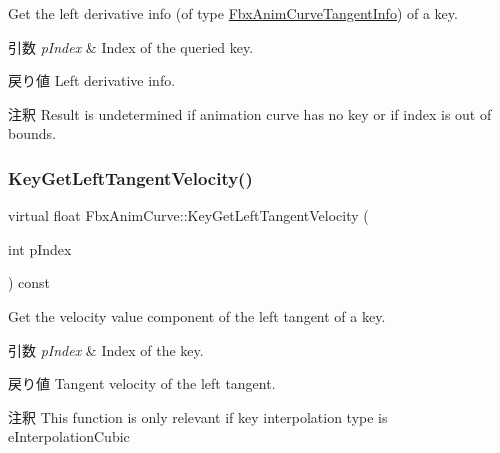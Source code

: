 Get the left derivative info (of type \hyperlink{struct_fbx_anim_curve_tangent_info}{Fbx\+Anim\+Curve\+Tangent\+Info}) of a key. 
\begin{DoxyParams}{引数}
{\em p\+Index} & Index of the queried key. \\
\hline
\end{DoxyParams}
\begin{DoxyReturn}{戻り値}
Left derivative info. 
\end{DoxyReturn}
\begin{DoxyRemark}{注釈}
Result is undetermined if animation curve has no key or if index is out of bounds. 
\end{DoxyRemark}
\mbox{\label{class_fbx_anim_curve_ad51bde65942e896c8fb7619ef4a4d149}} 
\subsubsection{\texorpdfstring{Key\+Get\+Left\+Tangent\+Velocity()}{KeyGetLeftTangentVelocity()}}
{\footnotesize\ttfamily virtual float Fbx\+Anim\+Curve\+::\+Key\+Get\+Left\+Tangent\+Velocity (\begin{DoxyParamCaption}\item[{int}]{p\+Index }\end{DoxyParamCaption}) const\hspace{0.3cm}{\ttfamily [pure virtual]}}

Get the velocity value component of the left tangent of a key. 
\begin{DoxyParams}{引数}
{\em p\+Index} & Index of the key. \\
\hline
\end{DoxyParams}
\begin{DoxyReturn}{戻り値}
Tangent velocity of the left tangent. 
\end{DoxyReturn}
\begin{DoxyRemark}{注釈}
This function is only relevant if key interpolation type is e\+Interpolation\+Cubic 
\end{DoxyRemark}
\mbox{\label{class_fbx_anim_curve_a9828bb0aa421a390a8bccdf161500e5a}} 
